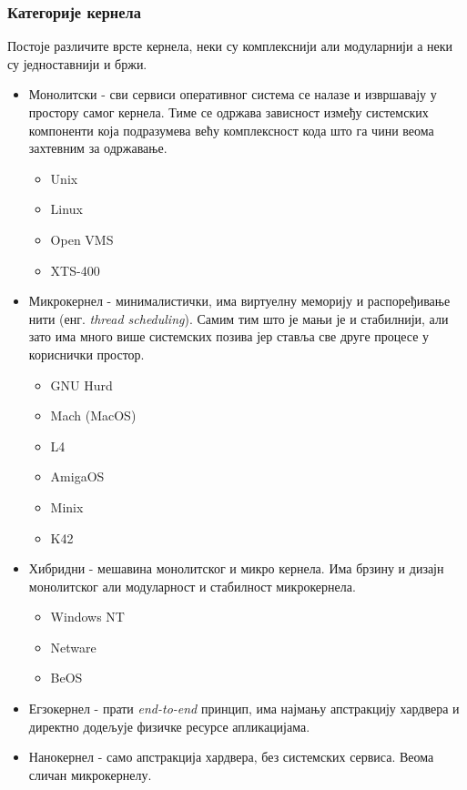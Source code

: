 \documentclass[a4paper,14pt]{article}
\begin{document}
\subsubsection{Категорије кернела}
Постоје различите врсте кернела\cite{kernelcats}, неки су комплекснији али модуларнији а неки су једноставнији и бржи.
\begin{itemize}
\item Монолитски - сви сервиси оперативног система се налазе и извршавају у простору самог кернела. Тиме се одржава зависност између системских компоненти која подразумева већу комплексност кода што га чини веома захтевним за одржавање.
\begin{itemize}
\item Unix
\item Linux
\item Open VMS
\item XTS-400
\end{itemize}
\item Микрокернел - минималистички, има виртуелну меморију и распоређивање нити (енг. \textit{thread scheduling}). Самим тим што је мањи је и стабилнији, али зато има много више системских позива јер ставља све друге процесе у кориснички простор.
\begin{itemize}
\item GNU Hurd
\item Mach (MacOS)
\item L4
\item AmigaOS
\item Minix
\item K42
\end{itemize}
\item Хибридни - мешавина монолитског и микро кернела. Има брзину и дизајн монолитског али модуларност и стабилност микрокернела.
\begin{itemize}
\item Windows NT
\item Netware
\item BeOS
\end{itemize}
\item Егзокернел - прати \textit{end-to-end} принцип, има најмању апстракцију хардвера и директно додељује физичке ресурсе апликацијама.
\item Нанокернел - само апстракција хардвера, без системских сервиса. Веома сличан микрокернелу.
\end{itemize}
\newpage
\end{document}
